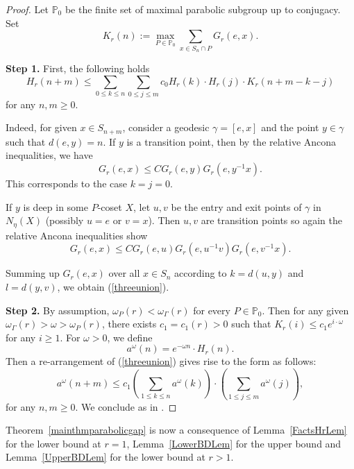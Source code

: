 \documentclass{amsart}
\newtheorem{cor}[thm]{Corollary}
\theoremstyle{definition}
\theoremstyle{remark}
\begin{document}
\begin{proof}
Let $\mathbb P_0$ be the finite set of maximal parabolic subgroup up to conjugacy.
Set $$K_r(n) := \max_{P\in\mathbb P_0}\sum_{x\in S_n\cap P} G_r(e,x).$$ 



\textbf{Step 1.} First, the following holds  
\begin{equation}\label{threeunion}
H_{r}(n+m) \le \sum_{0\le k \le n} \sum_{0\le j \le m}  c_0 H_{r}(k) \cdot H_{r}(j) \cdot   K_{r}(n+m-k-j)  
\end{equation}
for any $n, m\ge 0$. 

Indeed, for given $x\in S_{n+m}$, consider a  geodesic $\gamma=[e,x]$ and the point $y\in \gamma$ such that $d(e,y)=n$. If $y$ is a transition point, then by the relative Ancona inequalities, we have 
$$
G_r(e,x) \le C G_r(e, y) G_r(e, y^{-1}x).
$$
This corresponds to the case $k=j=0$.

If $y$ is deep in some $P$-coset $X$, let $u,v$ be the entry and exit points of $\gamma$ in $N_\eta(X)$ (possibly $u=e$ or $v=x$). Then $u,v$ are transition points so again the relative Ancona inequalities show   
$$
G_r(e,x) \le C G_r(e, u) G_r(e, u^{-1}v)  G_r(e, v^{-1}x).
$$

Summing up $G_r(e,x)$ over all $x\in S_n$ according to $k=d(u,y)$ and $l=d(y,v)$, we obtain (\ref{threeunion}). 

 
\textbf{Step 2.} 
By assumption,  $\omega_P(r) < \omega_\Gamma(r)$ for every $P\in \mathbb P_0$. Then for any given $\omega_\Gamma(r)  > \omega> \omega_P(r)$, there exists $c_1=c_1(r)>0$ such that $K_r(i)\le c_1 e^{i \cdot \omega }$ for any $i\ge 1$.
For $\omega>0$, we define $$a^\omega(n)= e^{-\omega n} \cdot H_{r}(n).$$ 
Then a re-arrangement of (\ref{threeunion}) gives rise to the form as follows:  
\begin{equation}\label{SubMulEQ}
a^\omega(n+m) \le c_1 \left( \sum_{1\le k\le n} a^\omega(k) \right) \cdot \left(\sum_{1\le j \le m} a^\omega(j) \right),
\end{equation}
for any $n, m \ge 0$.
We conclude as in \cite[Theorem 5.3]{YangSCC}.
\end{proof}

Theorem~\ref{mainthmparabolicgap} is now a consequence of Lemma~\ref{FactsHrLem} for the lower bound at $r=1$, Lemma~\ref{LowerBDLem} for the upper bound and Lemma~\ref{UpperBDLem} for the lower bound at $r>1$.
\end{document}
